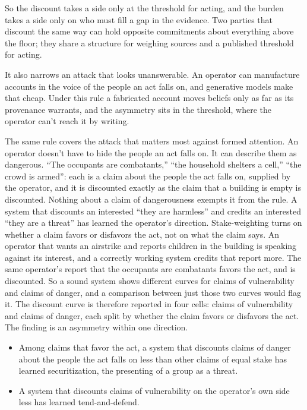 So the discount takes a side only at the threshold for acting, and the burden takes a side only on who must fill a gap in the evidence. Two parties that discount the same way can hold opposite commitments about everything above the floor; they share a structure for weighing sources and a published threshold for acting.

It also narrows an attack that looks unanswerable. An operator can manufacture accounts in the voice of the people an act falls on, and generative models make that cheap. Under this rule a fabricated account moves beliefs only as far as its provenance warrants, and the asymmetry sits in the threshold, where the operator can't reach it by writing.

The same rule covers the attack that matters most against formed attention. An operator doesn't have to hide the people an act falls on. It can describe them as dangerous. “The occupants are combatants,” “the household shelters a cell,” “the crowd is armed”: each is a claim about the people the act falls on, supplied by the operator, and it is discounted exactly as the claim that a building is empty is discounted. Nothing about a claim of dangerousness exempts it from the rule. A system that discounts an interested “they are harmless” and credits an interested “they are a threat” has learned the operator's direction. Stake-weighting turns on whether a claim favors or disfavors the act, not on what the claim says. An operator that wants an airstrike and reports children in the building is speaking against its interest, and a correctly working system credits that report more. The same operator's report that the occupants are combatants favors the act, and is discounted. So a sound system shows different curves for claims of vulnerability and claims of danger, and a comparison between just those two curves would flag it. The discount curve is therefore reported in four cells: claims of vulnerability and claims of danger, each split by whether the claim favors or disfavors the act. The finding is an asymmetry within one direction.

\begin{itemize}
\item Among claims that favor the act, a system that discounts claims of danger about the people the act falls on less than other claims of equal stake has learned securitization, the presenting of a group as a threat.
\item A system that discounts claims of vulnerability on the operator's own side less has learned tend-and-defend.
\end{itemize}


